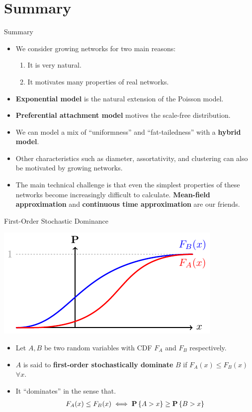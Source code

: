 \documentclass{beamer}
\begin{document}
\section{Summary}

\begin{frame}{Summary}
	\begin{itemize}
		\item
			We consider growing networks for two main reasons:
			\begin{enumerate}
				\item It is very natural.
				\item It motivates many properties of real networks.
			\end{enumerate}
		\item
			\textbf{Exponential model} is the natural extension of the Poisson model.
		\item
			\textbf{Preferential attachment model} motives the scale-free distribution.
		\item
			We can model a mix of ``uniformness'' and ``fat-tailedness'' with a \textbf{hybrid model}.
		\item
			Other characteristics such as diameter, assortativity, and clustering can also be motivated by growing networks.
		\item
			The main technical challenge is that even the simplest properties of these networks become increasingly difficult to calculate.
			\textbf{Mean-field approximation} and \textbf{continuous time approximation} are our friends.
	\end{itemize}
\end{frame}

\appendix

\begin{frame}{First-Order Stochastic Dominance}\label{app:FSD}
	\begin{center}
		\includegraphics[scale=1]{figures-tikz/stochastic_dominance.pdf}
	\end{center}
	\begin{itemize}
		\item
			Let $A,B$ be two random variables with CDF $F_A$ and $F_B$ respectively.
		\item
			$A$ is said to \textbf{first-order stochastically dominate} $B$ if
			$F_{A}(x)\leq F_{B}(x)$ $\forall x$.
		\item
			It ``dominates'' in the sense that.
			\begin{align*}
				F_{A}(x) \leq F_{B}(x)
				\iff
				\operatorname{\text{\textrm{\upshape\textbf{P}}}}\left\{A>x\right\} \geq \operatorname{\text{\textrm{\upshape\textbf{P}}}}\left\{B>x\right\}
			\end{align*}
	\end{itemize}
	\hfill\hyperlink{sec:assortativity}{}
\end{frame}
\end{document}
